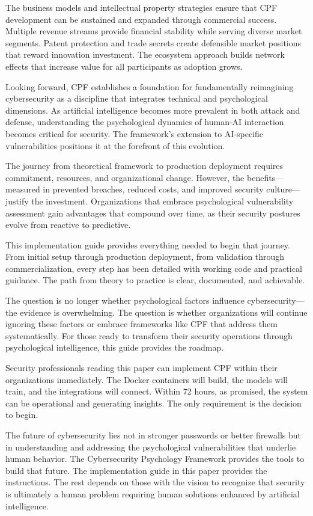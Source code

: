 \documentclass[11pt,a4paper]{article}
\begin{document}
The business models and intellectual property strategies ensure that CPF development can be sustained and expanded through commercial success. Multiple revenue streams provide financial stability while serving diverse market segments. Patent protection and trade secrets create defensible market positions that reward innovation investment. The ecosystem approach builds network effects that increase value for all participants as adoption grows.

Looking forward, CPF establishes a foundation for fundamentally reimagining cybersecurity as a discipline that integrates technical and psychological dimensions. As artificial intelligence becomes more prevalent in both attack and defense, understanding the psychological dynamics of human-AI interaction becomes critical for security. The framework's extension to AI-specific vulnerabilities positions it at the forefront of this evolution.

The journey from theoretical framework to production deployment requires commitment, resources, and organizational change. However, the benefits—measured in prevented breaches, reduced costs, and improved security culture—justify the investment. Organizations that embrace psychological vulnerability assessment gain advantages that compound over time, as their security postures evolve from reactive to predictive.

This implementation guide provides everything needed to begin that journey. From initial setup through production deployment, from validation through commercialization, every step has been detailed with working code and practical guidance. The path from theory to practice is clear, documented, and achievable.

The question is no longer whether psychological factors influence cybersecurity—the evidence is overwhelming. The question is whether organizations will continue ignoring these factors or embrace frameworks like CPF that address them systematically. For those ready to transform their security operations through psychological intelligence, this guide provides the roadmap.

Security professionals reading this paper can implement CPF within their organizations immediately. The Docker containers will build, the models will train, and the integrations will connect. Within 72 hours, as promised, the system can be operational and generating insights. The only requirement is the decision to begin.

The future of cybersecurity lies not in stronger passwords or better firewalls but in understanding and addressing the psychological vulnerabilities that underlie human behavior. The Cybersecurity Psychology Framework provides the tools to build that future. The implementation guide in this paper provides the instructions. The rest depends on those with the vision to recognize that security is ultimately a human problem requiring human solutions enhanced by artificial intelligence.
\end{document}
